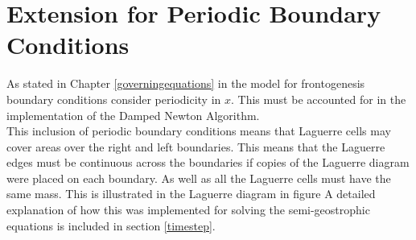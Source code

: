 \section{Extension for Periodic Boundary Conditions}
As stated in Chapter \ref{governingequations} in the model for frontogenesis boundary conditions consider periodicity in $x$. This must be accounted for in the implementation of the Damped Newton Algorithm.
\\
\linebreak
This inclusion of periodic boundary conditions means that Laguerre cells may cover areas over the right and left boundaries. This means that the Laguerre edges must be continuous across the boundaries if copies of the Laguerre diagram were placed on each boundary. As well as all the Laguerre cells must have the same mass. This is illustrated in the Laguerre diagram in figure 
A detailed explanation of how this was implemented for solving the semi-geostrophic equations is included in section \ref{timestep}.\\
\linebreak
{}
